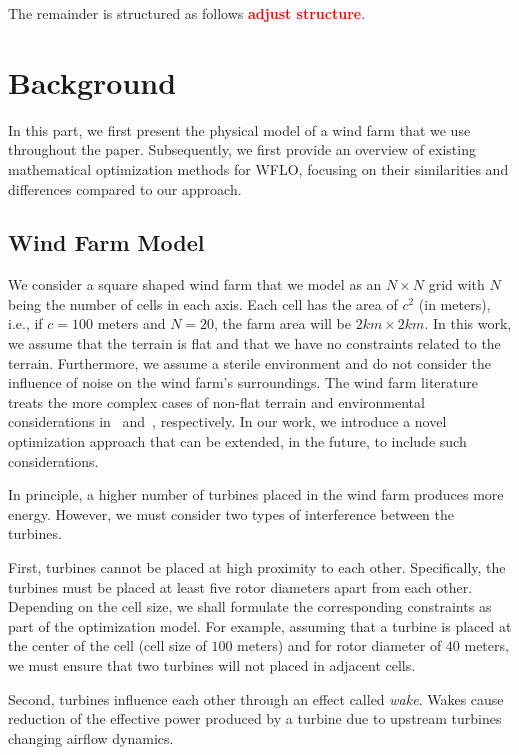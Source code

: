 \documentclass[preprint,12pt]{elsarticle}
\newcommand{\todo}[1]{{\textcolor{red}{\bf {#1}}}}
\begin{document}
The remainder is structured as follows \todo{adjust structure}. 


\section{Background}
\label{sec:related}

In this part, we first present the
physical model of a wind farm that we use throughout the paper. 
Subsequently, we first provide an overview of 
existing mathematical
optimization methods for WFLO, focusing
on their similarities and differences
compared to our approach.
 
\subsection{Wind Farm Model}

We consider a square shaped wind farm that we model 
as an $N\times N$ grid
with $N$ being the number of cells in each axis. 
Each cell has the area of $c^2$ (in meters), i.e.,
if $c=100$ meters and $N=20$, the farm area will be $2km\times 2km$.
In this work, we assume that the terrain is flat and that 
we have no constraints related to the terrain.
Furthermore, we assume a sterile environment and do not consider the influence of noise
on the wind farm's surroundings. The wind farm literature treats the more complex
cases of non-flat terrain and environmental considerations in~\cite{} and~\cite{}, respectively.
In our work, we introduce a novel optimization approach that can be extended,
in the future, to include 
such considerations. 
 
In principle, a higher number of turbines placed in the wind farm produces more energy. However,
we must consider two types of interference between the turbines. 

First, 
turbines cannot be placed at high proximity to each other. 
Specifically, the turbines must be placed at least five rotor diameters apart from each other. Depending on the cell size, we shall formulate the corresponding constraints as part of the optimization model. 
For example, assuming that a turbine is placed
at the center of the cell (cell size of $100$ meters) and for rotor diameter of $40$ meters, 
we must ensure that two turbines will not placed in adjacent cells. 

Second, turbines influence each other through an effect called \emph{wake}. Wakes cause reduction of the effective power produced by a turbine due to upstream turbines changing airflow dynamics.
\end{document}
